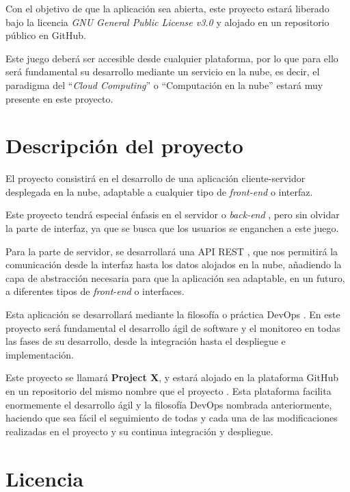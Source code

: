 Con el objetivo de que la aplicación sea abierta, este proyecto estará liberado bajo la licencia \textit{GNU General Public License v3.0} \cite{licenciaproyecto} y alojado en un repositorio público en GitHub.

Este juego deberá ser accesible desde cualquier plataforma, por lo que para ello será fundamental su desarrollo mediante un servicio en la nube, es decir, el paradigma del ``\textit{Cloud Computing}'' o ``Computación en la nube'' \cite{nube1} estará muy presente en este proyecto.

\section{Descripción del proyecto}

El proyecto consistirá en el desarrollo de una aplicación cliente-servidor desplegada en la nube, adaptable a cualquier tipo de \textit{front-end} \cite{frontback} o interfaz.

Este proyecto tendrá especial énfasis en el servidor o \textit{back-end} \cite{frontback}, pero sin olvidar la parte de interfaz, ya que se busca que los usuarios se enganchen a este juego.

Para la parte de servidor, se desarrollará una API REST\cite{api1} \cite{api2}\cite{api3}, que nos permitirá la comunicación desde la interfaz hasta los datos alojados en la nube, añadiendo la capa de abstracción necesaria para que la aplicación sea adaptable, en un futuro, a diferentes tipos de \textit{front-end} o interfaces. 

Esta aplicación se desarrollará mediante la filosofía o práctica DevOps \cite{devops1} \cite{devops2} \cite{devops3} \cite{devops4}. En este proyecto será fundamental el desarrollo ágil de software y el monitoreo en todas las fases de su desarrollo, desde la integración hasta el despliegue e implementación.

Este proyecto se llamará \textbf{Project X}, y estará alojado en la plataforma GitHub en un repositorio del mismo nombre que el proyecto \cite{proyectogithub}. Esta plataforma facilita enormemente el desarrollo ágil y la filosofía DevOps nombrada anteriormente, haciendo que sea fácil el seguimiento de todas y cada una de las modificaciones realizadas en el proyecto y su continua integración y despliegue.

\section{Licencia}

